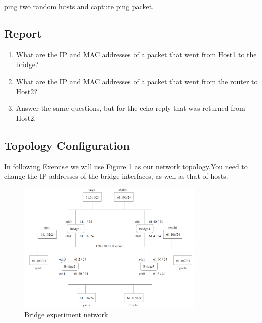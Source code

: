 \documentclass[10pt,a4paper]{article}
\numberwithin{equation}{section}
\numberwithin{figure}{section}
\numberwithin{table}{section}
\begin{document}
    ping two random hosts and capture ping packet.		

    \subsection*{Report}
    \begin{enumerate}
        \item What are the IP and MAC addresses of a packet that went from Host1 to the bridge? 
        \item What are the IP and MAC addresses of a packet that went from the router to Host2?
        \item Answer the same questions, but for the echo reply that was returned from Host2.
    \end{enumerate}

    
    
        
\subsection{Topology Configuration}
   In following Exercise we will use Figure \ref{fig:bridge-ex} as our network topology.You need to change the IP addresses of the bridge interfaces, as well as that of hosts.

\begin{figure}[H]
    \centering
    \includegraphics[width=0.8\textwidth]{img/fig4.png}
    \caption{Bridge experiment network}
    \label{fig:bridge-ex}
\end{figure}
\end{document}
